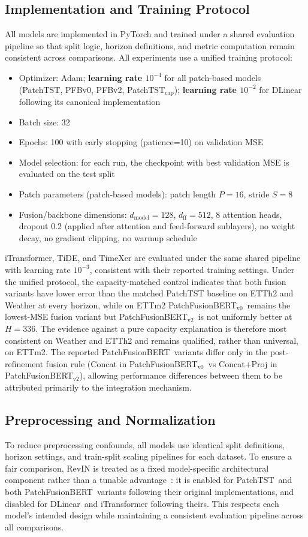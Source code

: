\documentclass{ieeeaccess}
\newcommand{\model}{PatchFusionBERT\xspace}
\newcommand{\modelvzero}{PatchFusionBERT$_{\text{v0}}$\xspace}
\newcommand{\modelvtwo}{PatchFusionBERT$_{\text{v2}}$\xspace}
\newcommand{\patchtst}{PatchTST\xspace}
\newcommand{\dlinear}{DLinear\xspace}
\begin{document}
\subsection{Implementation and Training Protocol}
All models are implemented in PyTorch and trained under a shared 
evaluation pipeline so that split logic, horizon definitions, and metric 
computation remain consistent across comparisons.
All experiments use a unified training protocol:
\begin{itemize}
    \item Optimizer: Adam; \textbf{learning rate $10^{-4}$} for all
    patch-based models (PatchTST, PFBv0, PFBv2, PatchTST$_\text{cap}$);
    \textbf{learning rate $10^{-2}$} for DLinear following its canonical implementation
    \item Batch size: 32
    \item Epochs: 100 with early stopping (patience=10) on validation MSE
    \item Model selection: for each run, the checkpoint with best 
    validation MSE is evaluated on the test split
    \item Patch parameters (patch-based models): patch length $P=16$, 
    stride $S=8$
    \item Fusion/backbone dimensions: $d_{\text{model}}=128$, 
    $d_{\text{ff}}=512$, 8 attention heads, dropout 0.2 (applied after
    attention and feed-forward sublayers), no weight decay, no gradient clipping,
    no warmup schedule
\end{itemize}
iTransformer, TiDE, and TimeXer are evaluated under the same shared pipeline
with learning rate $10^{-3}$, consistent with their reported training settings.
Under the unified protocol, the capacity-matched control indicates that both
fusion variants have lower error than the matched PatchTST baseline on ETTh2
and Weather at every horizon, while on ETTm2 \modelvzero\ remains the
lowest-MSE fusion variant but \modelvtwo\ is not uniformly better at $H=336$.
The evidence against a pure capacity explanation is therefore most consistent on
Weather and ETTh2 and remains qualified, rather than universal, on ETTm2.
The reported \model\ variants differ only in the post-refinement fusion 
rule (Concat in \modelvzero\ vs Concat+Proj in \modelvtwo), allowing 
performance differences between them to be attributed primarily to the 
integration mechanism.

\subsection{Preprocessing and Normalization}
To reduce preprocessing confounds, all models use identical
split definitions, horizon settings, and train-split scaling
pipelines for each dataset. To ensure a fair comparison,
RevIN is treated as a fixed model-specific architectural
component rather than a tunable advantage~\cite{kim2022revin}:
it is enabled for \patchtst\ and both \model\ variants
following their original implementations, and disabled for
\dlinear\ and iTransformer following theirs. This respects
each model's intended design while maintaining a consistent
evaluation pipeline across all comparisons.
\end{document}
